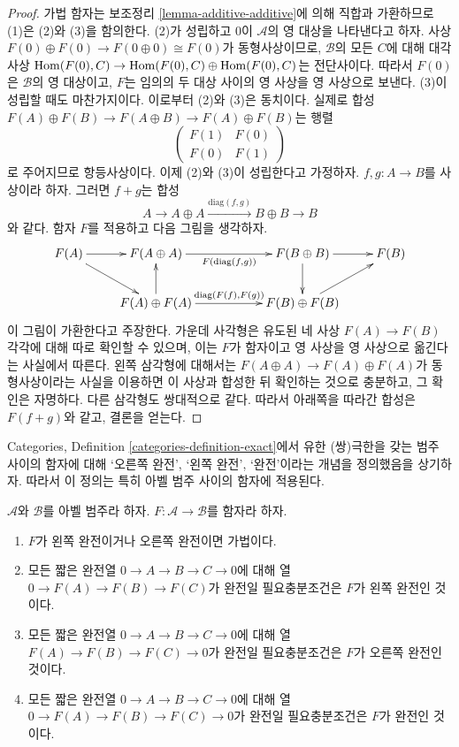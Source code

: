 \begin{proof}
가법 함자는 보조정리 \ref{lemma-additive-additive}에 의해 직합과
가환하므로 (1)은 (2)와 (3)을 함의한다. (2)가 성립하고 $0$이
$\mathcal{A}$의 영 대상을 나타낸다고 하자. 사상
$F(0) \oplus F(0) \to F(0 \oplus 0) \cong F(0)$가 동형사상이므로,
$\mathcal{B}$의 모든 $C$에 대해 대각 사상
$\mathop{\mathrm{Hom}}\nolimits(F(0), C) \to \mathop{\mathrm{Hom}}\nolimits(F(0), C) \oplus \mathop{\mathrm{Hom}}\nolimits(F(0), C)$는 전단사이다.
따라서 $F(0)$은 $\mathcal{B}$의 영 대상이고, $F$는 임의의 두 대상
사이의 영 사상을 영 사상으로 보낸다. (3)이 성립할 때도 마찬가지이다.
이로부터 (2)와 (3)은 동치이다. 실제로 합성
$F(A) \oplus F(B) \to F(A \oplus B) \to F(A) \oplus F(B)$는 행렬
$$
\left(
\begin{matrix}
F(1) & F(0) \\
F(0) & F(1)
\end{matrix}
\right)
$$
로 주어지므로 항등사상이다. 이제 (2)와 (3)이 성립한다고 가정하자.
$f, g : A \to B$를 사상이라 하자. 그러면 $f + g$는 합성
$$
A \to A \oplus A \xrightarrow{\text{diag}(f, g)} B \oplus B \to B
$$
와 같다. 함자 $F$를 적용하고 다음 그림을 생각하자.
$$
\xymatrix{
F(A) \ar[r] \ar[rd] &
F(A \oplus A) \ar[rr]_{F(\text{diag}(f, g))} & &
F(B \oplus B) \ar[r] \ar[d] &
F(B) \\
&
F(A) \oplus F(A) \ar[u] \ar[rr]^{\text{diag}(F(f), F(g))} & &
F(B) \oplus F(B) \ar[ru]
}
$$
이 그림이 가환한다고 주장한다. 가운데 사각형은 유도된 네 사상
$F(A) \to F(B)$ 각각에 대해 따로 확인할 수 있으며, 이는 $F$가 함자이고
영 사상을 영 사상으로 옮긴다는 사실에서 따른다. 왼쪽 삼각형에 대해서는
$F(A \oplus A) \to F(A) \oplus F(A)$가 동형사상이라는 사실을 이용하면
이 사상과 합성한 뒤 확인하는 것으로 충분하고, 그 확인은 자명하다.
다른 삼각형도 쌍대적으로 같다. 따라서 아래쪽을 따라간 합성은
$F(f + g)$와 같고, 결론을 얻는다.
\end{proof}

\noindent
Categories, Definition \ref{categories-definition-exact}에서 유한
(쌍)극한을 갖는 범주 사이의 함자에 대해 ‘오른쪽 완전’, ‘왼쪽 완전’,
‘완전’이라는 개념을 정의했음을 상기하자. 따라서 이 정의는 특히 아벨
범주 사이의 함자에 적용된다.

\begin{lemma}
\label{lemma-exact-functor}
$\mathcal{A}$와 $\mathcal{B}$를 아벨 범주라 하자.
$F : \mathcal{A} \to \mathcal{B}$를 함자라 하자.
\begin{enumerate}
\item $F$가 왼쪽 완전이거나 오른쪽 완전이면 가법이다.
\item 모든 짧은 완전열 $0 \to A \to B \to C \to 0$에 대해
열 $0 \to F(A) \to F(B) \to F(C)$가 완전일 필요충분조건은
$F$가 왼쪽 완전인 것이다.
\item 모든 짧은 완전열 $0 \to A \to B \to C \to 0$에 대해
열 $F(A) \to F(B) \to F(C) \to 0$가 완전일 필요충분조건은
$F$가 오른쪽 완전인 것이다.
\item 모든 짧은 완전열 $0 \to A \to B \to C \to 0$에 대해
열 $0 \to F(A) \to F(B) \to F(C) \to 0$가 완전일 필요충분조건은
$F$가 완전인 것이다.
\end{enumerate}
\end{lemma}

